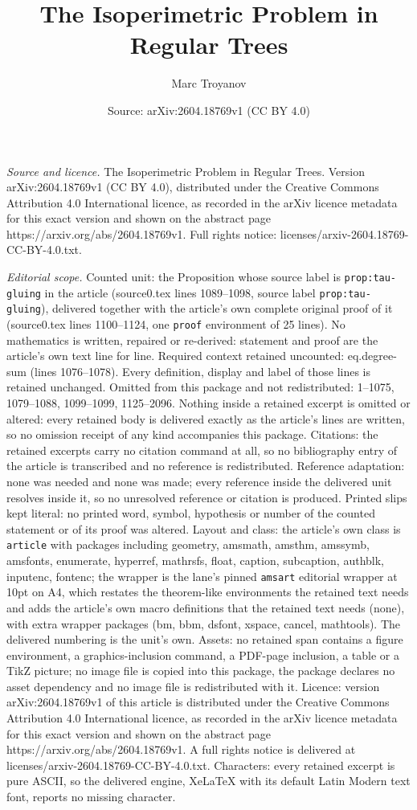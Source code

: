 \documentclass[10pt,a4paper]{amsart}
\title[The Isoperimetric Problem in Regular Trees]{The Isoperimetric Problem in Regular Trees}
\author{Marc Troyanov}
\date{Source: arXiv:2604.18769v1 (CC BY 4.0)}
\begin{document}
\maketitle

\noindent\emph{Source and licence.} The Isoperimetric Problem in Regular Trees. Version arXiv:2604.18769v1 (CC BY 4.0), distributed under the Creative Commons Attribution 4.0 International licence, as recorded in the arXiv licence metadata for this exact version and shown on the abstract page https://arxiv.org/abs/2604.18769v1. Full rights notice: licenses/arxiv-2604.18769-CC-BY-4.0.txt.\par\smallskip

\noindent\textit{Editorial scope.} Counted unit: the Proposition whose source label is \texttt{prop:tau-gluing} in the article (source0.tex lines 1089--1098, source label \texttt{prop:tau-gluing}), delivered together with the article's own complete original proof of it (source0.tex lines 1100--1124, one \texttt{proof} environment of 25 lines). No mathematics is written, repaired or re-derived: statement and proof are the article's own text line for line. Required context retained uncounted: eq.degree-sum (lines 1076--1078). Every definition, display and label of those lines is retained unchanged. Omitted from this package and not redistributed: 1--1075, 1079--1088, 1099--1099, 1125--2096. Nothing inside a retained excerpt is omitted or altered: every retained body is delivered exactly as the article's lines are written, so no omission receipt of any kind accompanies this package. Citations: the retained excerpts carry no citation command at all, so no bibliography entry of the article is transcribed and no reference is redistributed. Reference adaptation: none was needed and none was made; every reference inside the delivered unit resolves inside it, so no unresolved reference or citation is produced. Printed slips kept literal: no printed word, symbol, hypothesis or number of the counted statement or of its proof was altered. Layout and class: the article's own class is \texttt{article} with packages including geometry, amsmath, amsthm, amssymb, amsfonts, enumerate, hyperref, mathrsfs, float, caption, subcaption, authblk, inputenc, fontenc; the wrapper is the lane's pinned \texttt{amsart} editorial wrapper at 10pt on A4, which restates the theorem-like environments the retained text needs and adds the article's own macro definitions that the retained text needs (none), with extra wrapper packages (bm, bbm, dsfont, xspace, cancel, mathtools). The delivered numbering is the unit's own. Assets: no retained span contains a figure environment, a graphics-inclusion command, a PDF-page inclusion, a table or a TikZ picture; no image file is copied into this package, the package declares no asset dependency and no image file is redistributed with it. Licence: version arXiv:2604.18769v1 of this article is distributed under the Creative Commons Attribution 4.0 International licence, as recorded in the arXiv licence metadata for this exact version and shown on the abstract page https://arxiv.org/abs/2604.18769v1. A full rights notice is delivered at licenses/arxiv-2604.18769-CC-BY-4.0.txt. Characters: every retained excerpt is pure ASCII, so the delivered engine, XeLaTeX with its default Latin Modern text font, reports no missing character.
\end{document}
